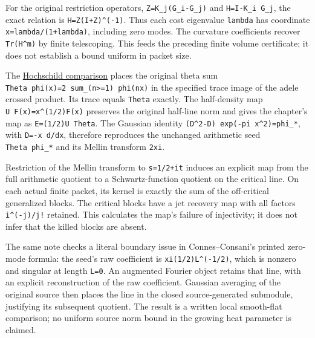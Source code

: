 \documentclass[
]{article}
\begin{document}
For the original restriction operators, \texttt{Z=K\_j(G\_i-G\_j)} and
\texttt{H=I-K\_i\ G\_j}, the exact relation is
\texttt{H=Z(I+Z)\^{}(-1)}. Thus each cost eigenvalue \texttt{lambda} has
coordinate \texttt{x=lambda/(1+lambda)}, including zero modes. The
curvature coefficients recover \texttt{Tr(H\^{}m)} by finite
telescoping. This feeds the preceding finite volume certificate; it does
not establish a bound uniform in packet size.

The
\href{https://github.com/KokunoYumeto/zeta-function-research-reader/blob/a4a87844c257485ae6d669f5b3eb6d96b9e8b8d8/workbenches/tau-specialization-curvature-formal/HOCHSCHILD_COMPARISON.md}{Hochschild
comparison} places the original theta sum
\texttt{Theta\ phi(x)=2\ sum\_(n\textgreater{}=1)\ phi(nx)} in the
specified trace image of the adele crossed product. Its trace equals
\texttt{Theta} exactly. The half-density map
\texttt{U\ F(x)=x\^{}(1/2)F(x)} preserves the original half-line norm
and gives the chapter's map as \texttt{E=(1/2)U\ Theta}. The Gaussian
identity \texttt{(D\^{}2-D)\ exp(-pi\ x\^{}2)=phi\_*}, with
\texttt{D=-x\ d/dx}, therefore reproduces the unchanged arithmetic seed
\texttt{Theta\ phi\_*} and its Mellin transform \texttt{2xi}.

Restriction of the Mellin transform to \texttt{s=1/2+it} induces an
explicit map from the full arithmetic quotient to a Schwartz-function
quotient on the critical line. On each actual finite packet, its kernel
is exactly the sum of the off-critical generalized blocks. The critical
blocks have a jet recovery map with all factors \texttt{i\^{}(-j)/j!}
retained. This calculates the map's failure of injectivity; it does not
infer that the killed blocks are absent.

The same note checks a literal boundary issue in Connes--Consani's
printed zero-mode formula: the seed's raw coefficient is
\texttt{xi(1/2)L\^{}(-1/2)}, which is nonzero and singular at length
\texttt{L=0}. An augmented Fourier object retains that line, with an
explicit reconstruction of the raw coefficient. Gaussian averaging of
the original source then places the line in the closed source-generated
submodule, justifying its subsequent quotient. The result is a written
local smooth-flat comparison; no uniform source norm bound in the
growing heat parameter is claimed.
\end{document}
